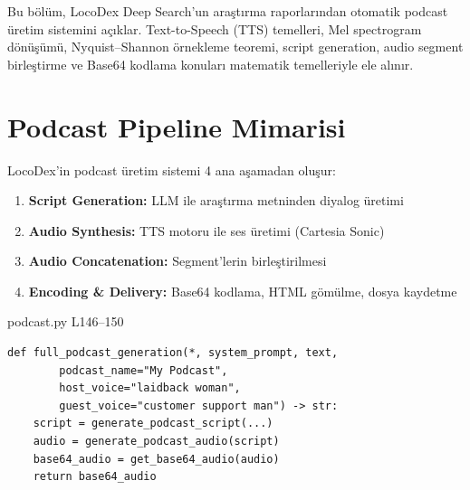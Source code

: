 
Bu b\"{o}l\"{u}m, LocoDex Deep Search'un ara\c{s}t{\i}rma raporlar{\i}ndan otomatik podcast \"{u}retim sistemini a\c{c}{\i}klar. Text-to-Speech (TTS) temelleri, Mel spectrogram d\"{o}n\"{u}\c{s}\"{u}m\"{u}, Nyquist--Shannon \"{o}rnekleme teoremi, script generation, audio segment birle\c{s}tirme ve Base64 kodlama konular{\i} matematik temelleriyle ele al{\i}n{\i}r.


\section{Podcast Pipeline Mimarisi}
\label{sec:podcast_overview}

LocoDex'in podcast \"{u}retim sistemi 4 ana a\c{s}amadan olu\c{s}ur:

\begin{enumerate}
  \item \textbf{Script Generation:} LLM ile ara\c{s}t{\i}rma metninden diyalog \"{u}retimi
  \item \textbf{Audio Synthesis:} TTS motoru ile ses \"{u}retimi (Cartesia Sonic)
  \item \textbf{Audio Concatenation:} Segment'lerin birle\c{s}tirilmesi
  \item \textbf{Encoding \& Delivery:} Base64 kodlama, HTML g\"{o}m\"{u}lme, dosya kaydetme
\end{enumerate}

\begin{kodref}{podcast.py L146--150}
\begin{lstlisting}[caption={Tam podcast \"{u}retim ak{\i}\c{s}{\i}}]
def full_podcast_generation(*, system_prompt, text,
        podcast_name="My Podcast",
        host_voice="laidback woman",
        guest_voice="customer support man") -> str:
    script = generate_podcast_script(...)
    audio = generate_podcast_audio(script)
    base64_audio = get_base64_audio(audio)
    return base64_audio
\end{lstlisting}
\end{kodref}

